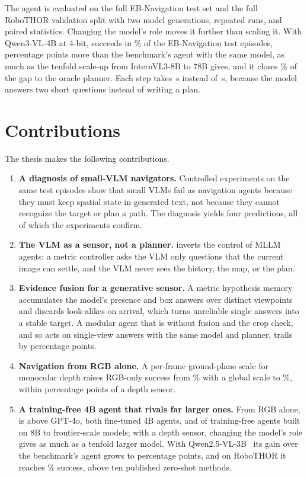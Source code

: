 The agent is evaluated on the full EB-Navigation test set and the full RoboTHOR validation split with two model
generations, repeated runs, and paired statistics. Changing the model's role moves it further than scaling it. With
Qwen3-VL-4B at 4-bit, \ours succeeds in \nSThree\% of the EB-Navigation test episodes, \nGainThree{} percentage points
more than the benchmark's agent with the same model, as much as the tenfold scale-up from InternVL3-8B to 78B gives,
and it closes \nGapClosed\% of the gap to the oracle planner. Each step takes \nSecS\,s instead of \nSecEB\,s, because
the model answers two short questions instead of writing a plan.

\section{Contributions}
\label{sec:intro-contrib}
The thesis makes the following contributions.
\begin{enumerate}
\item \textbf{A diagnosis of small-VLM navigators.} Controlled experiments on the same test episodes show that small
VLMs fail as navigation agents because they must keep spatial state in generated text, not because they cannot
recognize the target or plan a path. The diagnosis yields four predictions, all of which the experiments confirm.
\item \textbf{The VLM as a sensor, not a planner.} \ours inverts the control of MLLM agents: a metric controller asks
the VLM only questions that the current image can settle, and the VLM never sees the history, the map, or the plan.
\item \textbf{Evidence fusion for a generative sensor.} A metric hypothesis memory accumulates the model's presence
and box answers over distinct viewpoints and discards look-alikes on arrival, which turns unreliable single
answers into a stable target. A modular agent that is \ours without fusion and the crop check, and so acts on single-view
answers with the same model and planner, trails \ours by \nSOverMod{} percentage points.
\item \textbf{Navigation from RGB alone.} A per-frame ground-plane scale for monocular depth raises RGB-only success
from \nRGBGlobal\% with a global scale to \nRGBThree\%, within \nGapRGBAbs{} percentage points of a depth sensor.
\item \textbf{A training-free 4B agent that rivals far larger ones.} From RGB alone, \ours is above GPT-4o, both fine-tuned
4B agents, and \nNTrainFreeBelowRGB{} of \nNTrainFree{} training-free agents built on 8B to frontier-scale models; with a depth sensor, changing the
model's role gives as much as a tenfold larger model. With Qwen2.5-VL-3B~\cite{bai2025qwen25vl}
its gain over the benchmark's agent grows to \nGainTwo{} percentage points, and on RoboTHOR it reaches \nRoboSR\%
success, above ten published zero-shot methods.
\end{enumerate}


